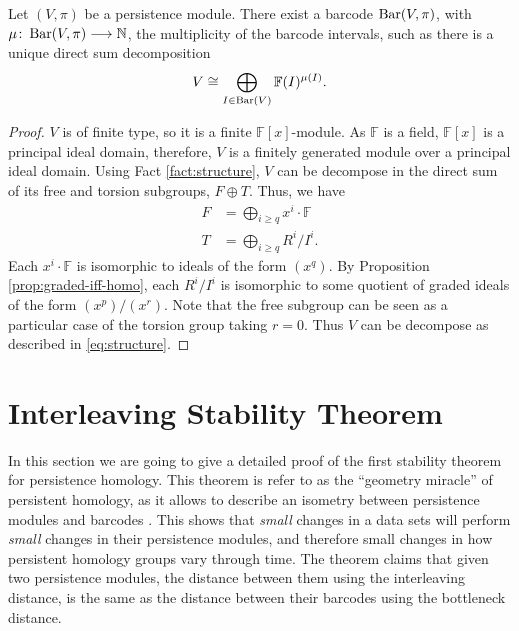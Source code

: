 \begin{theorem}[Structure] \cite[Proposition 4.8]{wang} \label{structure}
    Let $ (V, \pi) $ be a persistence module. There exist a barcode $ \operatorname{Bar}(V, \pi) $, with $ \mu \colon \operatorname{Bar} (V, \pi) \longrightarrow \mathbb N $, the multiplicity of the barcode intervals, such as there is a unique direct sum decomposition
    \begin{align}
        V \cong \bigoplus_{I \in  \operatorname{Bar} (V)} \mathbb F (I)^{\mu (I)}. \label{eq:structure}
    \end{align}
\end{theorem}
\begin{proof}
    $ V $ is of finite type, so it is a finite $ \mathbb F[x] $-module. As $ \mathbb F $ is a field, $ \mathbb F[x] $ is a principal ideal domain, therefore, $ V $ is a finitely generated module over a principal ideal domain. Using Fact \ref{fact:structure}, $ V $ can be decompose in the direct sum of its free and torsion subgroups, $ F \oplus T $. Thus, we have
    \begin{align}
        F &= \bigoplus_{i\geq q} x^i \cdot \mathbb F \\
        T &= \bigoplus_{i\geq q} R^i / I^i.
    \end{align}
    Each $ x^i \cdot \mathbb F $ is isomorphic to ideals of the form $ (x^q) $. By Proposition \ref{prop:graded-iff-homo}, each $ R^i / I^i $ is isomorphic to some quotient of graded ideals of the form $ (x^p) / (x^r)$. Note that the free subgroup can be seen as a particular case of the torsion group taking $ r = 0 $. Thus $ V $ can be decompose as described in \eqref{eq:structure}.
\end{proof}

\newpage
\chapter{Interleaving Stability Theorem}
In this section we are going to give a detailed proof of the first stability theorem for persistence homology. This theorem is refer to as the ``geometry miracle'' of persistent homology, as it allows to describe an isometry between persistence modules and barcodes \cite{nanda}. This shows that {\it small} changes in a data sets will perform {\it small} changes in their persistence modules, and therefore small changes in how persistent homology groups vary through time. The theorem claims that given two persistence modules, the distance between them using the interleaving distance, is the same as the distance between their barcodes using the bottleneck distance.

